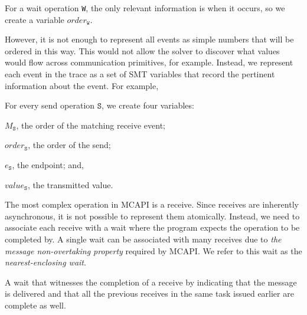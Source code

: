 \begin{definition}[Wait] \label{def:event}
For a wait operation \texttt{W}, the only relevant information is when
it occurs, so we create a variable $\mathit{order}_\mathtt{W}$.
\end{definition}

However, it is not enough to represent all events as simple numbers
that will be ordered in this way. This would not allow the solver to
discover what values would flow across communication primitives, for
example. Instead, we represent each event in the trace as a set of SMT
variables that record the pertinent information about the event. For
example,

\begin{definition}[Send] \label{def:snd}
For every send operation $\mathtt{S}$, we create four variables:
\begin{compactenum}
\item $M_\mathtt{S}$, the order of the matching receive event;

\item $\mathit{order}_\mathtt{S}$, the order of the send;

\item $e_\mathtt{S}$, the endpoint; and,

\item $\mathit{value}_\mathtt{S}$, the transmitted value.
\end{compactenum}
\end{definition}

The most complex operation in MCAPI is a receive. Since receives are
inherently asynchronous, it is not possible to represent them
atomically. Instead, we need to associate each receive with a wait
where the program expects the operation to be completed by. A single
wait can be associated with many receives due to \emph{the message
  non-overtaking property} required by MCAPI. We refer to this wait as
the \emph{nearest-enclosing wait}.

\begin{definition} \label{def:nw}
A wait that witnesses the completion of a receive by indicating that
the message is delivered and that all the previous receives in the
same task issued earlier are complete as well.
\end{definition}

